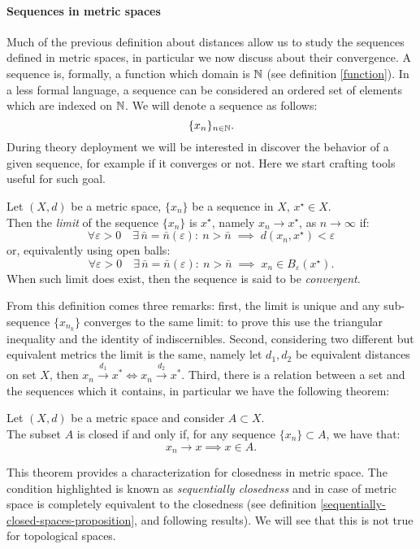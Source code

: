 \paragraph{Sequences in metric spaces} Much of the previous definition about distances allow us to study the sequences defined in metric spaces, in particular we now discuss about their convergence. A sequence is, formally, a function which domain is $\mathbb N$ (see definition \vref{function}). In a less formal language, a sequence can be considered an ordered set of elements which are indexed on $\mathbb N$. We will denote a sequence as follows:
$$
\{x_n\}_{n \in \mathbb N}
.
$$
During theory deployment we will be interested in discover the behavior of a given sequence, for example if it converges or not. Here we start crafting tools useful for such goal.
\begin{defn} \label{limit-in-metric-spaces}
	Let $(X, d)$ be a metric space, $\{x_n\}$ be a sequence in $X$, $x^\star \in X$.\\
	Then the \emph{limit} of the sequence $\{x_n\}$ is $x^\star$, namely $x_n\to x^\star$, as $n\to \infty$ if:
	$$\forall\varepsilon > 0 \quad \exists \, \bar{n}=\bar{n}\left(\varepsilon\right): \ n>\bar{n}\; \implies\; d\left(x_n,x^\star\right)<\varepsilon$$
	or, equivalently using open balls:
	$$\forall\varepsilon > 0 \quad \exists \, \bar{n}=\bar{n}\left(\varepsilon\right): \ n>\bar{n}\; \implies\; x_n\in B_\varepsilon \left(x^\star\right).$$
	When such limit does exist, then the sequence is said to be \emph{convergent}.
\end{defn}

From this definition comes three remarks: first, the limit is unique and any sub-sequence $\{x_{n_k}\}$ converges to the same limit: to prove this use the triangular inequality and the identity of indiscernibles. Second, considering two different but equivalent metrics the limit is the same, namely let $d_1, d_2$ be equivalent distances on set $X$, then $x_n \xrightarrow{d_1} x^* \iff x_n \xrightarrow{d_2} x^*$. Third, there is a relation between a set and the sequences which it contains, in particular we have the following theorem:

\begin{theo}\label{theo-closure-metric-spaces}
	Let $(X,d)$ be a metric space and consider $A \subset X$. \\
	The subset $A$ is closed if and only if, for any sequence $\{x_n\} \subset A$, we have that: 
	$$
		x_n \to x 
		\implies x \in A
	.
	$$
\end{theo}
This theorem provides a characterization for closedness in metric space. The condition highlighted is known as \textit{sequentially closedness} and in case of metric space is completely equivalent to the closedness (see definition \vref{sequentially-closed-spaces-proposition}, and following results). We will see that this is not true for topological spaces.

